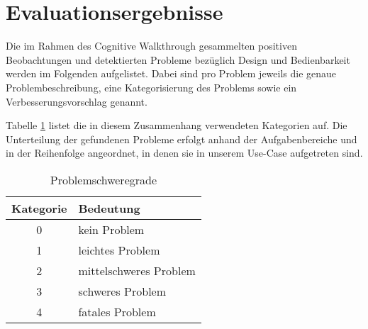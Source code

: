 \section{Evaluationsergebnisse}\label{sec:eval}
Die im Rahmen des Cognitive Walkthrough gesammelten positiven Beobachtungen und detektierten Probleme bezüglich Design und Bedienbarkeit werden im Folgenden aufgelistet. 
Dabei sind pro Problem jeweils die genaue Problembeschreibung, eine Kategorisierung des Problems sowie ein Verbesserungsvorschlag genannt.

Tabelle \ref{tbl:categories} listet die in diesem Zusammenhang verwendeten Kategorien auf. Die Unterteilung der gefundenen Probleme erfolgt anhand der Aufgabenbereiche und in der Reihenfolge angeordnet, in denen sie in unserem Use-Case aufgetreten sind.

\begin{table}[h]
	\centering\begin{tabular}{|c|l|}
		\hline
		\textbf{Kategorie} & \textbf{Bedeutung} \\
		\hline
		0 & kein Problem \\
		1 & leichtes Problem \\
		2 & mittelschweres Problem \\
		3 & schweres Problem \\
		4 & fatales Problem \\
		\hline
	\end{tabular}
	\caption{Problemschweregrade\label{tbl:categories}}
\end{table}